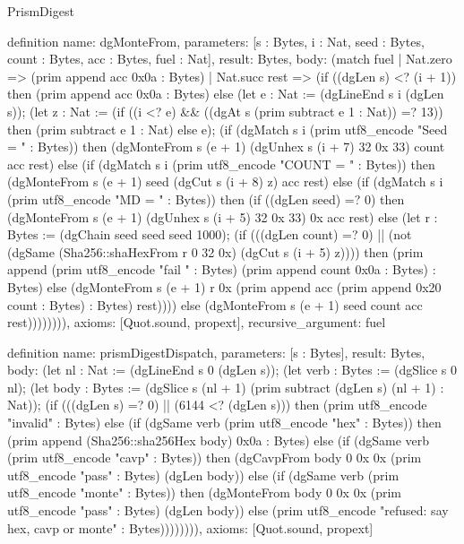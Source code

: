 \begin{lexlean}{PrismDigest}
\begin{semanticmodule}
definition{
  name: dgMonteFrom,
  parameters: [s : Bytes, i : Nat, seed : Bytes, count : Bytes, acc : Bytes, fuel : Nat],
  result: Bytes,
  body: (match fuel
    | Nat.zero => (prim append acc 0x0a : Bytes)
    | Nat.succ rest => (if ((dgLen s) <? (i + 1)) then (prim append acc 0x0a : Bytes) else (let e : Nat := (dgLineEnd s i (dgLen s)); (let z : Nat := (if ((i <? e) && ((dgAt s (prim subtract e 1 : Nat)) =? 13)) then (prim subtract e 1 : Nat) else e); (if (dgMatch s i (prim utf8_encode "Seed = " : Bytes)) then (dgMonteFrom s (e + 1) (dgUnhex s (i + 7) 32 0x 33) count acc rest) else (if (dgMatch s i (prim utf8_encode "COUNT = " : Bytes)) then (dgMonteFrom s (e + 1) seed (dgCut s (i + 8) z) acc rest) else (if (dgMatch s i (prim utf8_encode "MD = " : Bytes)) then (if ((dgLen seed) =? 0) then (dgMonteFrom s (e + 1) (dgUnhex s (i + 5) 32 0x 33) 0x acc rest) else (let r : Bytes := (dgChain seed seed seed 1000); (if (((dgLen count) =? 0) || (not (dgSame (Sha256::shaHexFrom r 0 32 0x) (dgCut s (i + 5) z)))) then (prim append (prim utf8_encode "fail " : Bytes) (prim append count 0x0a : Bytes) : Bytes) else (dgMonteFrom s (e + 1) r 0x (prim append acc (prim append 0x20 count : Bytes) : Bytes) rest)))) else (dgMonteFrom s (e + 1) seed count acc rest)))))))),
  axioms: [Quot.sound, propext],
  recursive_argument: fuel
}

definition{
  name: prismDigestDispatch,
  parameters: [s : Bytes],
  result: Bytes,
  body: (let nl : Nat := (dgLineEnd s 0 (dgLen s)); (let verb : Bytes := (dgSlice s 0 nl); (let body : Bytes := (dgSlice s (nl + 1) (prim subtract (dgLen s) (nl + 1) : Nat)); (if (((dgLen s) =? 0) || (6144 <? (dgLen s))) then (prim utf8_encode "invalid" : Bytes) else (if (dgSame verb (prim utf8_encode "hex" : Bytes)) then (prim append (Sha256::sha256Hex body) 0x0a : Bytes) else (if (dgSame verb (prim utf8_encode "cavp" : Bytes)) then (dgCavpFrom body 0 0x 0x (prim utf8_encode "pass" : Bytes) (dgLen body)) else (if (dgSame verb (prim utf8_encode "monte" : Bytes)) then (dgMonteFrom body 0 0x 0x (prim utf8_encode "pass" : Bytes) (dgLen body)) else (prim utf8_encode "refused: say hex, cavp or monte" : Bytes)))))))),
  axioms: [Quot.sound, propext]
}
\end{semanticmodule}
\end{lexlean}
